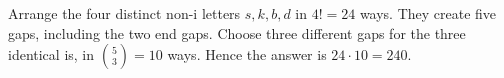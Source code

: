Arrange the four distinct non-i letters $s,k,b,d$ in $4!=24$ ways. They create five gaps, including the two end gaps. Choose three different gaps for the three identical i\textquotesingle s, in $\binom53=10$ ways. Hence the answer is $24\cdot10=\boxed{240}$.
